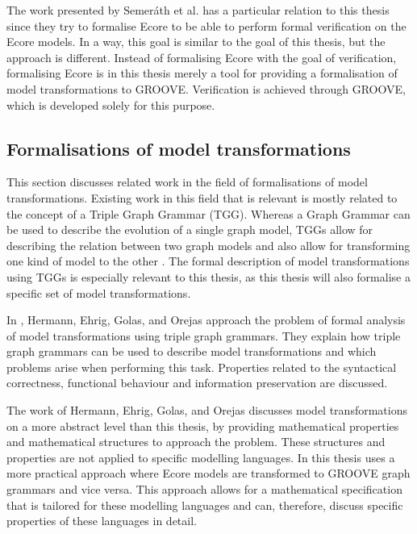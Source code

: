 The work presented by Semeráth et al. has a particular relation to this thesis since they try to formalise Ecore to be able to perform formal verification on the Ecore models. In a way, this goal is similar to the goal of this thesis, but the approach is different. Instead of formalising Ecore with the goal of verification, formalising Ecore is in this thesis merely a tool for providing a formalisation of model transformations to GROOVE. Verification is achieved through GROOVE, which is developed solely for this purpose.


\subsection{Formalisations of model transformations}
\label{subsec:introduction:related_work:formalisations_of_model_transformations}
This section discusses related work in the field of formalisations of model transformations. Existing work in this field that is relevant is mostly related to the concept of a Triple Graph Grammar (TGG). Whereas a Graph Grammar can be used to describe the evolution of a single graph model, TGGs allow for describing the relation between two graph models and also allow for transforming one kind of model to the other \cite{KW07_ag}. The formal description of model transformations using TGGs is especially relevant to this thesis, as this thesis will also formalise a specific set of model transformations.

In \cite{hermann_ehrig_golas_orejas_2014}, Hermann, Ehrig, Golas, and Orejas approach the problem of formal analysis of model transformations using triple graph grammars. They explain how triple graph grammars can be used to describe model transformations and which problems arise when performing this task. Properties related to the syntactical correctness, functional behaviour and information preservation are discussed.

The work of Hermann, Ehrig, Golas, and Orejas discusses model transformations on a more abstract level than this thesis, by providing mathematical properties and mathematical structures to approach the problem. These structures and properties are not applied to specific modelling languages. In this thesis uses a more practical approach where Ecore models are transformed to GROOVE graph grammars and vice versa. This approach allows for a mathematical specification that is tailored for these modelling languages and can, therefore, discuss specific properties of these languages in detail.

